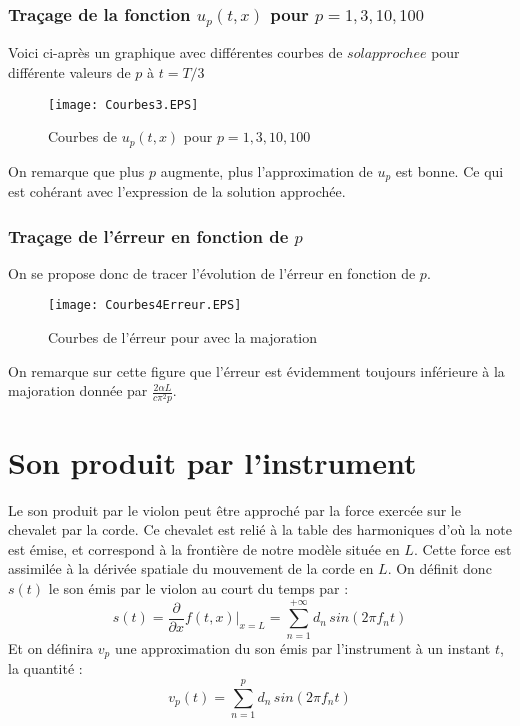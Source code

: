 \documentclass[12pt]{article}
\begin{document}
\subsubsection{Traçage de la fonction $u_p(t,x)$ pour $p=1,3,10,100$}
Voici ci-après un graphique avec différentes courbes de $solapprochee$ pour différente valeurs de $p$ à $t=T/3$
\newpage
\begin{figure}[!h]
\centering
\texttt{[image: Courbes3.EPS]}\\
\caption{Courbes de $u_p(t,x)$ pour $p=1,3,10,100$}
\end{figure}

On remarque que plus $p$ augmente, plus l'approximation de $u_p$ est bonne. Ce qui est cohérant avec l'expression de la solution approchée.
\subsubsection{Traçage de l'érreur en fonction de $p$}
On se propose donc de tracer l'évolution de l'érreur en fonction de $p$.
\begin{figure}[!h]
\centering
\texttt{[image: Courbes4Erreur.EPS]}\\
\caption{Courbes de l'érreur pour avec la majoration}
\end{figure}

On remarque sur cette figure que l'érreur est évidemment toujours inférieure à la majoration donnée par $\displaystyle \frac{2\alpha L}{c\pi^2 p}$.
\newpage
\section{Son produit par l'instrument}
Le son produit par le violon peut être approché par la force exercée sur le chevalet par la
corde. Ce chevalet est relié à la table des harmoniques d’où la note est émise, et correspond
à la frontière de notre modèle située en $L$. Cette force est assimilée à la dérivée spatiale du mouvement de la corde en $L$. On définit donc $s(t)$ le son émis par le violon au court du temps par :
\begin{equation}
	s(t)=\frac{\partial}{\partial x}f(t,x)\vert_{x=L}=\sum\limits_{n=1}^{+\infty} d_n\, sin(2\pi f_n t)
\end{equation}
Et on définira $v_p$ une approximation du son émis par l'instrument à un instant $t$, la quantité :
\begin{equation*}
	v_p(t)=\sum\limits_{n=1}^{p} d_n\, sin(2\pi f_n t)
\end{equation*}
\end{document}
